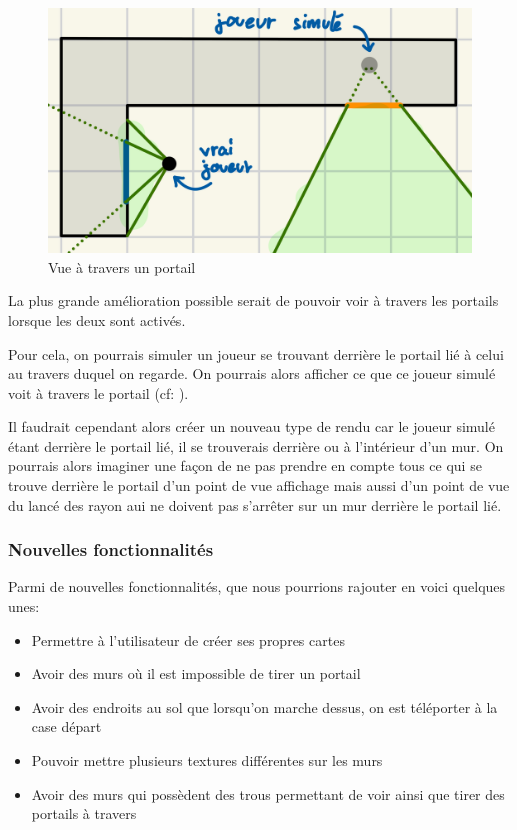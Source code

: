 \documentclass[11pt]{article}
\begin{document}
\begin{figure}
	\begin{minipage}{\textwidth}
		\center\includegraphics[width=0.8\linewidth]{image/vue-travers-portail.jpeg}
		\hspace*{-0.5cm}
		\caption{Vue à travers un portail}
		\label{fig:vue-travers-portail}
	\end{minipage}
\end{figure}

La plus grande amélioration possible serait de pouvoir voir à travers les portails
lorsque les deux sont activés.

Pour cela, on pourrais simuler un joueur se trouvant derrière le portail
lié à celui au travers duquel on regarde. On pourrais alors afficher
ce que ce joueur simulé voit à travers le portail (cf: ). 

Il faudrait cependant alors créer un nouveau type de rendu car le joueur
simulé étant derrière le portail lié, il se trouverais derrière ou à l'intérieur
d'un mur. On pourrais alors imaginer une façon de ne pas prendre en compte tous ce qui 
se trouve derrière le portail d'un point de vue affichage mais aussi 
d'un point de vue du lancé des rayon aui ne doivent pas s'arrêter sur
un mur derrière le portail lié.

\subsubsection{Nouvelles fonctionnalités}

Parmi de nouvelles fonctionnalités, que nous pourrions rajouter en voici quelques unes:
\begin{itemize}
	\item Permettre à l'utilisateur de créer ses propres cartes
	\item Avoir des murs où il est impossible de tirer un portail
	\item Avoir des endroits au sol que lorsqu'on marche dessus, on est téléporter à la case départ
	\item Pouvoir mettre plusieurs textures différentes sur les murs
	\item Avoir des murs qui possèdent des trous permettant de voir ainsi que tirer des portails à travers
\end{itemize}
\end{document}
